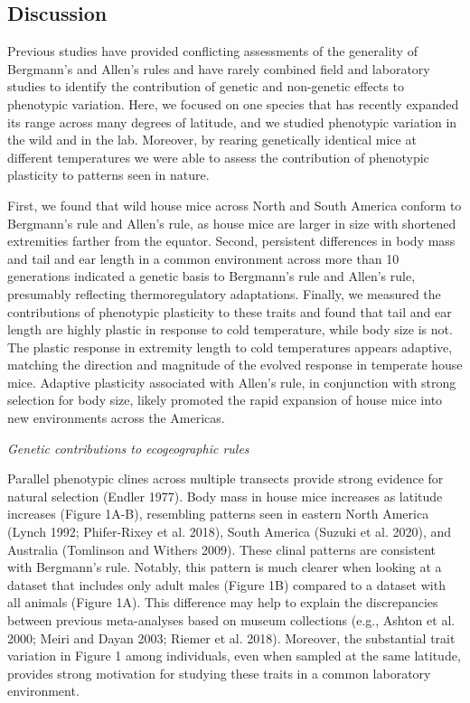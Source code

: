 \documentclass[]{article}
\begin{document}
\vspace{5mm}

\hypertarget{discussion}{%
\subsection{Discussion}\label{discussion}}

Previous studies have provided conflicting assessments of the generality
of Bergmann's and Allen's rules and have rarely combined field and
laboratory studies to identify the contribution of genetic and
non-genetic effects to phenotypic variation. Here, we focused on one
species that has recently expanded its range across many degrees of
latitude, and we studied phenotypic variation in the wild and in the
lab. Moreover, by rearing genetically identical mice at different
temperatures we were able to assess the contribution of phenotypic
plasticity to patterns seen in nature.

First, we found that wild house mice across North and South America
conform to Bergmann's rule and Allen's rule, as house mice are larger in
size with shortened extremities farther from the equator. Second,
persistent differences in body mass and tail and ear length in a common
environment across more than 10 generations indicated a genetic basis to
Bergmann's rule and Allen's rule, presumably reflecting thermoregulatory
adaptations. Finally, we measured the contributions of phenotypic
plasticity to these traits and found that tail and ear length are highly
plastic in response to cold temperature, while body size is not. The
plastic response in extremity length to cold temperatures appears
adaptive, matching the direction and magnitude of the evolved response
in temperate house mice. Adaptive plasticity associated with Allen's
rule, in conjunction with strong selection for body size, likely
promoted the rapid expansion of house mice into new environments across
the Americas.

\vspace{3.5mm}

\noindent\emph{Genetic contributions to ecogeographic rules}

Parallel phenotypic clines across multiple transects provide strong
evidence for natural selection (Endler 1977). Body mass in house mice
increases as latitude increases (Figure 1A-B), resembling patterns seen
in eastern North America (Lynch 1992; Phifer-Rixey et al. 2018), South
America (Suzuki et al. 2020), and Australia (Tomlinson and Withers
2009). These clinal patterns are consistent with Bergmann's rule.
Notably, this pattern is much clearer when looking at a dataset that
includes only adult males (Figure 1B) compared to a dataset with all
animals (Figure 1A). This difference may help to explain the
discrepancies between previous meta-analyses based on museum collections
(e.g., Ashton et al. 2000; Meiri and Dayan 2003; Riemer et al. 2018).
Moreover, the substantial trait variation in Figure 1 among individuals,
even when sampled at the same latitude, provides strong motivation for
studying these traits in a common laboratory environment.
\end{document}

